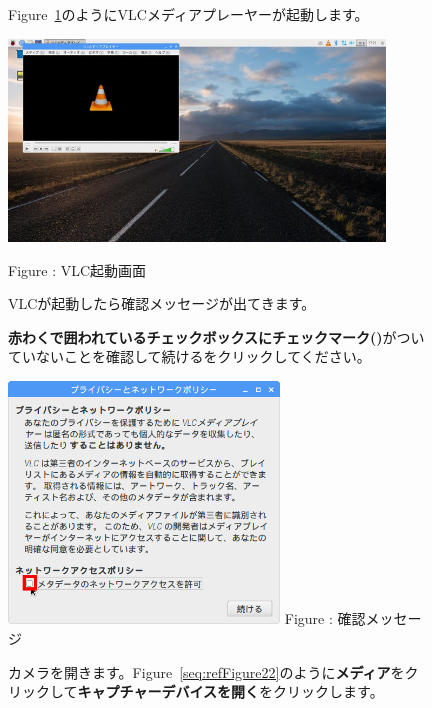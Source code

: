 \documentclass[a4paper,12pt]{jarticle}
\begin{document}
\begin{figure}[ht]
  Figure~\ref{seq:refFigure20}のようにVLCメディアプレーヤーが起動します。



  \centering
  \begin{minipage}{10cm}
    \includegraphics[width=10cm]{textbook-img114.jpg}


    Figure {\theFigure\label{seq:refFigure20}}: VLC起動画面
  \end{minipage}
  \flushleft
  VLCが起動したら確認メッセージが出てきます。

  \textbf{\textcolor[rgb]{1.0,0.2,0.2}{赤わくで囲われているチェックボックスにチェックマーク(\CheckedBox)}}がついていないことを確認して続けるをクリックしてください。



  \centering
  \begin{minipage}{7.186cm}
    {\upshape
      \includegraphics[width=7.2cm]{textbook-img115.png}
      \newline
      Figure : 確認メッセージ}
  \end{minipage}

  \flushleft
  カメラを開きます。Figure~\ref{seq:refFigure22}のように\textbf{メディア}をクリックして\textbf{キャプチャーデバイスを開く}をクリックします。



\end{figure}
\end{document}
